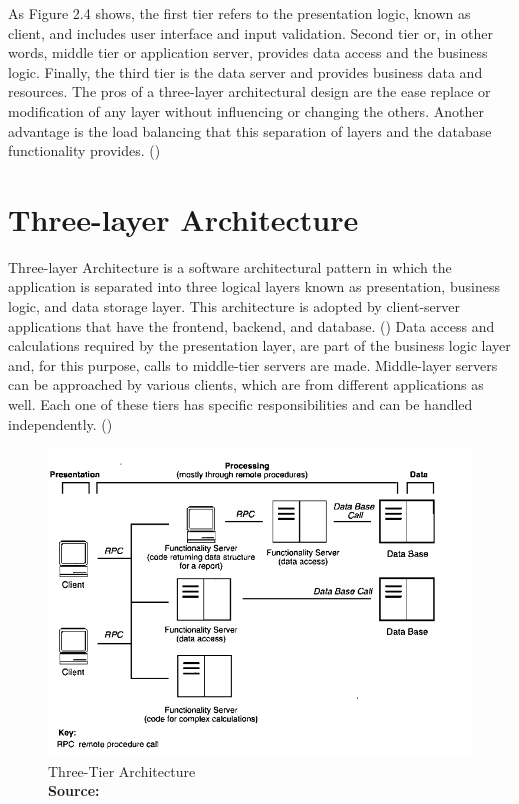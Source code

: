 As Figure 2.4 shows, the first tier refers to the presentation logic, known as client, and includes user interface and input validation. Second tier or, in other words, middle tier or application server, provides data access and the business logic. Finally, the third tier is the data server and provides business data and resources. The pros of a three-layer architectural design are the ease replace or modification of any layer without influencing or changing the others. Another advantage is the load balancing that this separation of layers and the database functionality provides. (\cite{Reference3})


\section{Three-layer Architecture}

Three-layer Architecture is a software architectural pattern in which the application is separated into three logical layers known as presentation, business logic, and data storage layer. This architecture is adopted by client-server applications that have the frontend, backend, and database. (\cite{Reference2}) Data access and calculations required by the presentation layer, are part of the business logic layer and, for this purpose, calls to middle-tier servers are made. Middle-layer servers can be approached by various clients, which are from different applications as well. Each one of these tiers has specific responsibilities and can be handled independently. (\cite{Reference5}) \par

\begin{figure}[h!]
	\begin{center}
		\includegraphics[scale=0.85]{images/three-layer-architecture-details.png}
	\end{center}
	\caption{
		Three-Tier Architecture
		\\
		\textbf{Source:} \cite{Reference5}
	}
\end{figure}

